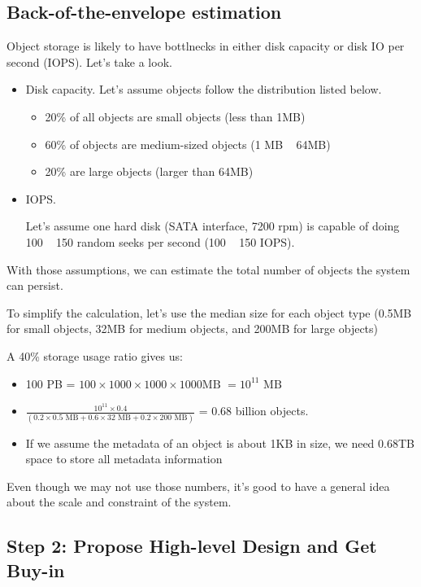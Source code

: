 \documentclass{report}
\theoremstyle{definition}
\let\oldsubsection\subsection
\renewcommand{\subsection}{\oldsubsection*}
\begin{document}
\subsection{Back-of-the-envelope estimation}

Object storage is likely to have bottlnecks in either disk capacity or disk IO per second (IOPS). Let's take a look.

\begin{itemize}
\item
Disk capacity. Let's assume objects follow the distribution listed below.

\begin{itemize}
\item
20\% of all objects are small objects (less than 1MB)
\item
60\% of objects are medium-sized objects (1 MB ~ 64MB)
\item
20\% are large objects (larger than 64MB)
\end{itemize}

\item
IOPS.

Let's assume one hard disk (SATA interface, 7200 rpm) is capable of doing 100 ~ 150 random seeks per second (100 ~ 150 IOPS).
\end{itemize}

With those assumptions, we can estimate the total number of objects the system can persist.

To simplify the calculation, let's use the median size for each object type (0.5MB for small objects, 32MB for medium objects, and 200MB for large objects)

A 40\% storage usage ratio gives us:

\begin{itemize}
\item
100 PB = $100 \times 1000 \times 1000 \times 1000 \text{MB } = 10^{11} \text{ MB}$
\item
$\frac{10^{11} \times 0.4}{(0.2 \times 0.5 \text{ MB} + 0.6 \times 32 \text{ MB} + 0.2 \times 200 \text{ MB})}$ = 0.68 billion objects.
\item
If we assume the metadata of an object is about 1KB in size, we need 0.68TB space to store all metadata information
\end{itemize}

Even though we may not use those numbers, it's good to have a general idea about the scale and constraint of the system.

\subsection{Step 2: Propose High-level Design and Get Buy-in}
\end{document}

